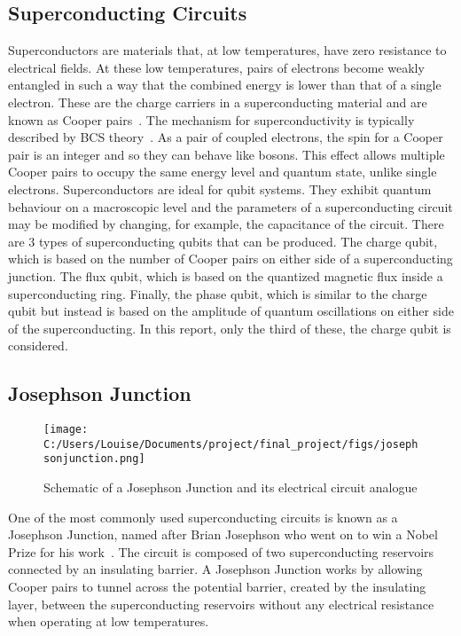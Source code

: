 \documentclass[11pt]{article}
\begin{document}
\subsection{Superconducting Circuits}
Superconductors are materials that, at low temperatures, have zero resistance to electrical fields. At these low temperatures, pairs of electrons become weakly entangled in such a way that the combined energy is lower than that of a single electron. These are the charge carriers in a superconducting material and are known as Cooper pairs~\cite{CooperBoundElectronPairs1956}. The mechanism for superconductivity is typically described by BCS theory~\cite{bardeenTheorySuperconductivity1957}. As a pair of coupled electrons, the spin for a Cooper pair is an integer and so they can behave like bosons. This effect allows multiple Cooper pairs to occupy the same energy level and quantum state, unlike single electrons. Superconductors are ideal for qubit systems. They exhibit quantum behaviour on a macroscopic level and the parameters of a superconducting circuit may be modified by changing, for example, the capacitance of the circuit. There are 3 types of superconducting qubits that can be produced. The charge qubit, which is based on the number of Cooper pairs on either side of a superconducting junction. The flux qubit, which is based on the quantized magnetic flux inside a superconducting ring. Finally, the phase qubit, which is similar to the charge qubit but instead is based on the amplitude of quantum oscillations on either side of the superconducting. In this report, only the third of these, the charge qubit is considered.

\subsection{Josephson Junction}
\begin{figure}[ht]
\centering
\texttt{[image: C:/Users/Louise/Documents/project/final\_project/figs/josephsonjunction.png]}
\caption{Schematic of a Josephson Junction and its electrical circuit analogue}
\label{fig:picture1}
\end{figure}
One of the most commonly used superconducting circuits is known as a Josephson Junction, named after Brian Josephson who went on to win a Nobel Prize for his work~\cite{josephsonDiscoveryTunnellingSupercurrents1974,josephsonPossibleNewEffects1962}.
The circuit is composed of two superconducting reservoirs connected by an insulating barrier.
A Josephson Junction works by allowing Cooper pairs to tunnel across the potential barrier, created by the insulating layer, between the superconducting reservoirs without any electrical resistance when operating at low temperatures.
\end{document}
